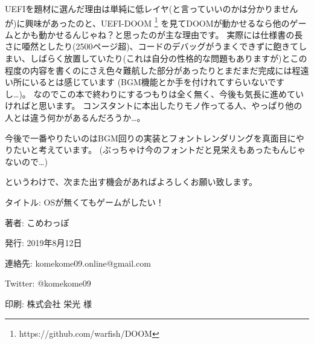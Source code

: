 \documentclass[10pt,b5paper,twoside,openany]{ltjsbook}
\begin{document}
UEFIを題材に選んだ理由は単純に低レイヤ(と言っていいのかは分かりませんが)に興味があったのと、UEFI-DOOM
\footnote{https://github.com/warfish/DOOM}
を見てDOOMが動かせるなら他のゲームとかも動かせるんじゃね？と思ったのが主な理由です。
実際には仕様書の長さに唖然としたり(2500ページ超)、コードのデバッグがうまくできずに飽きてしまい、しばらく放置していたり(これは自分の性格的な問題もありますが)とこの程度の内容を書くのにさえ色々難航した部分があったりとまだまだ完成には程遠い所にいるとは感じています
(BGM機能とか手を付けれてすらいないですし…)。
なのでこの本で終わりにするつもりは全く無く、今後も気長に進めていければと思います。
コンスタントに本出したりモノ作ってる人、やっぱり他の人とは違う何かがあるんだろうか…。

今後で一番やりたいのはBGM回りの実装とフォントレンダリングを真面目にやりたいと考えています。
(ぶっちゃけ今のフォントだと見栄えもあったもんじゃないので…)

というわけで、次また出す機会があればよろしくお願い致します。
\newpage

\thispagestyle{empty}
\printbibliography[title=参考文献]
\newpage

\thispagestyle{empty}
\begin{flushright}
    \begin{minipage}{0.8\hsize}
        \begin{description}
            \item{タイトル: } OSが無くてもゲームがしたい！
            \item{著者: }こめわっぽ
            \item{発行: }2019年8月12日
            \item{連絡先: }komekome09.online@gmail.com
            \item{Twitter: }@komekome09
            \item{印刷: }株式会社 栄光 様
        \end{description}
    \end{minipage}
\end{flushright}
\newpage

\thispagestyle{empty}
\mbox{}
\newpage


\end{document}

